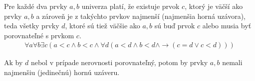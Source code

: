 Pre každé dva prvky $a, b$ univerza platí, že existuje prvok $c$, ktorý je väčší ako prvky $a,b$ a
zároveň je z takýchto prvkov najmenší (najmenšia horná uzávora), teda všetky prvky $d$, ktoré sú
tiež väčšie ako $a,b$ sú buď prvok $c$ alebo musia byť porovnateľné s prvkom $c$.
\begin{align*}
\forall a \forall b \exists c (a < c \land b < c \land  \forall d (a < d \land b < d \land
                \rightarrow (c = d \lor c < d )))
\end{align*}

Ak by $d$ nebol v prípade nerovnosti porovnateľný, potom by prvky $a,b$ nemali najmenšiu
(jedinečnú) hornú uzáveru.

